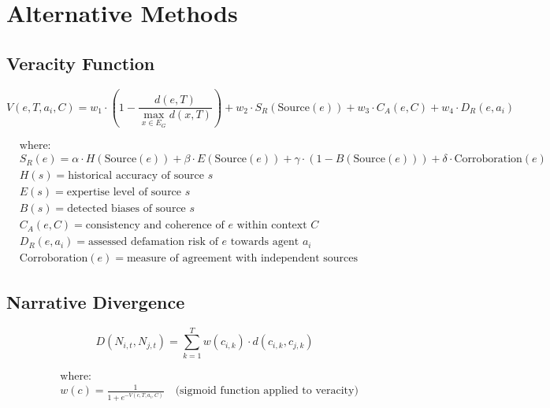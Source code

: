 \documentclass[12pt, a4paper]{article}
\begin{document}
\section{Alternative Methods}

\subsection{Veracity Function}


\begin{equation}
V(e, T, a_i, C) = w_1 \cdot \left(1 - \frac{d(e, T)}{\max_{x \in E_G} d(x, T)}\right) + w_2 \cdot S_R(\text{Source}(e)) + w_3 \cdot C_A(e, C) + w_4 \cdot D_R(e, a_i)
\end{equation}

\begin{equation}
\begin{aligned}
& \text{where:} \\
& S_R(e) = \alpha \cdot H(\text{Source}(e)) + \beta \cdot E(\text{Source}(e)) + \gamma \cdot (1 - B(\text{Source}(e))) + \delta \cdot \text{Corroboration}(e) \\
& H(s) = \text{historical accuracy of source } s \\
& E(s) = \text{expertise level of source } s \\
& B(s) = \text{detected biases of source } s \\
& C_A(e, C) = \text{consistency and coherence of } e \text{ within context } C \\
& D_R(e, a_i) = \text{assessed defamation risk of } e \text{ towards agent } a_i \\
& \text{Corroboration}(e) = \text{measure of agreement with independent sources}
\end{aligned}
\end{equation}


\subsection{Narrative Divergence}


\begin{equation}
D(N_{i,t}, N_{j,t}) = \sum_{k=1}^{T} w(c_{i,k}) \cdot d(c_{i,k}, c_{j,k})
\end{equation}

\begin{equation}
\begin{aligned}
& \text{where:} \\
& w(c) = \frac{1}{1 + e^{-V(c, T, a_i, C)}} \quad \text{(sigmoid function applied to veracity)}
\end{aligned}
\end{equation}
\end{document}
